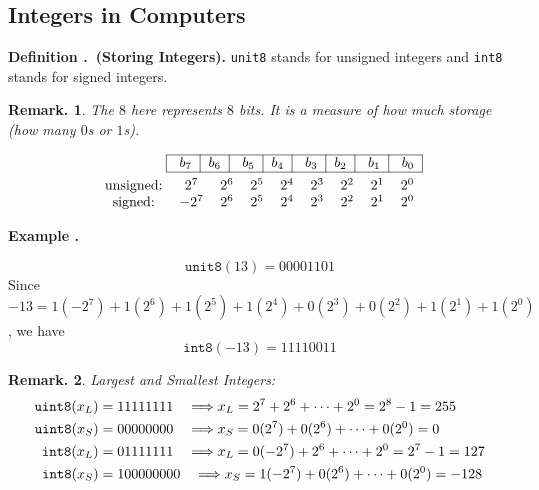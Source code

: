 \documentclass[12pt, a4paper]{article}
\newcounter{index}[subsection]
\newenvironment*{df}[1]{\par\noindent\textbf{Definition \thesubsection.\stepcounter{index}\theindex\ (#1).}}{\par}
\newenvironment*{eg}[1]{\begin{framed}\par\noindent\textbf{Example \thesubsection.\stepcounter{index}\theindex\ #1} \par}{\par\end{framed}}
\newtheorem*{rmk}{Remark.}
\begin{document}
\subsection{Integers in Computers}
\begin{df}{Storing Integers}
	\texttt{unit8} stands for unsigned integers and \texttt{int8} stands for signed integers. 
	\begin{rmk} The $8$ here represents $8$ bits. It is a measure of how much storage (how many $0$s or $1$s).\end{rmk}
	\[\begin{aligned}
	\begin{tabular}{|c|c|c|c|c|c|c|c|}
		\hline
		\ $b_7$&$b_6$\ &\ $b_5$&$b_4$\ &\ $b_3$&$b_2$\ &\ $b_1$&\ $b_0$\\
		\hline
	\end{tabular}&\\
	\begin{tabular}{ccccccccc}	
		unsigned: &$2^7$&$2^6$&$2^5$&$2^4$&$2^3$&$2^2$&$2^1$&$2^0$\\
		signed:   &$-2^7$&$2^6$&$2^5$&$2^4$&$2^3$&$2^2$&$2^1$&$2^0$
	\end{tabular}&
	\end{aligned}\]
\end{df}
\begin{eg}{}
	\[\texttt{unit8}(13)=00001101\] Since $-13=1(-2^7)+1(2^6)+1(2^5)+1(2^4)+0(2^3)+0(2^2)+1(2^1)+1(2^0)$, we have \[\texttt{int8}(-13)=11110011\]
\end{eg}
\begin{rmk}
	Largest and Smallest Integers: \[\begin{aligned}\textnormal{\texttt{uint8}}(x_L)&=11111111\quad\Longrightarrow x_L=2^7+2^6+\cdots+2^0=2^8-1=255\\\textnormal{\texttt{uint8}}(x_S)&=00000000\quad\Longrightarrow x_S=0(2^7)+0(2^6)+\cdots+0(2^0)=0\\\textnormal{\texttt{int8}}(x_L)&=01111111\quad\Longrightarrow x_L=0(-2^7)+2^6+\cdots+2^0=2^7-1=127\\\textnormal{\texttt{int8}}(x_S)&=100000000\quad\Longrightarrow x_S=1(-2^7)+0(2^6)+\cdots+0(2^0)=-128\end{aligned}\]	
\end{rmk}
\end{document}
